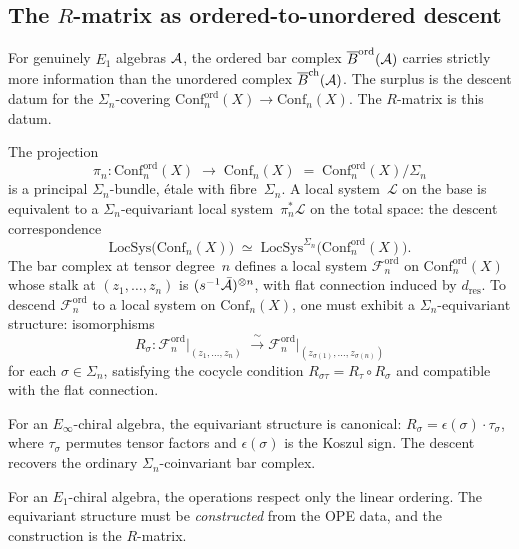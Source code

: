 \subsection{The $R$-matrix as ordered-to-unordered descent}
\label{subsec:r-matrix-monodromy}

For genuinely $E_1$ algebras $\mathcal{A}$, the ordered bar complex
$\overline{B}^{\mathrm{ord}}(\mathcal{A})$ carries strictly more information than the
unordered complex $\overline{B}^{\mathrm{ch}}(\mathcal{A})$. The surplus is the descent datum
for the $\Sigma_n$-covering
$\mathrm{Conf}_n^{\mathrm{ord}}(X)\to\mathrm{Conf}_n(X)$. The
$R$-matrix is this datum.

\begin{construction}
\label{constr:r-matrix-covering}
The projection
\[
\pi_n\colon
\mathrm{Conf}_n^{\mathrm{ord}}(X)
\;\longrightarrow\;
\mathrm{Conf}_n(X)
\;=\;
\mathrm{Conf}_n^{\mathrm{ord}}(X)/\Sigma_n
\]
is a principal $\Sigma_n$-bundle, \'etale with fibre~$\Sigma_n$.
A local system~$\mathcal{L}$ on the base is equivalent to a
$\Sigma_n$-equivariant local system~$\pi_n^*\mathcal{L}$ on the total
space: the descent correspondence
\[
\mathrm{LocSys}\bigl(\mathrm{Conf}_n(X)\bigr)
\;\simeq\;
\mathrm{LocSys}^{\Sigma_n}
\bigl(\mathrm{Conf}_n^{\mathrm{ord}}(X)\bigr).
\]
The bar complex at tensor degree~$n$ defines a local system
$\mathcal{F}_n^{\mathrm{ord}}$ on $\mathrm{Conf}_n^{\mathrm{ord}}(X)$
whose stalk at $(z_1,\dots,z_n)$ is
$(s^{-1}\bar{\mathcal{A}})^{\otimes n}$, with flat connection induced by
$d_{\mathrm{res}}$. To descend $\mathcal{F}_n^{\mathrm{ord}}$ to a
local system on $\mathrm{Conf}_n(X)$, one must exhibit a
$\Sigma_n$-equivariant structure: isomorphisms
\[
R_\sigma\colon
\mathcal{F}_n^{\mathrm{ord}}\big|_{(z_1,\dots,z_n)}
\;\xrightarrow{\;\sim\;}
\mathcal{F}_n^{\mathrm{ord}}\big|_{(z_{\sigma(1)},\dots,z_{\sigma(n)})}
\]
for each $\sigma\in\Sigma_n$, satisfying the cocycle condition
$R_{\sigma\tau}=R_\tau\circ R_\sigma$ and compatible with the
flat connection.

For an $E_\infty$-chiral algebra, the equivariant structure
is canonical: $R_\sigma=\epsilon(\sigma)\cdot\tau_\sigma$, where
$\tau_\sigma$ permutes tensor factors and $\epsilon(\sigma)$ is
the Koszul sign. The descent recovers the ordinary
$\Sigma_n$-coinvariant bar complex.

For an $E_1$-chiral algebra, the operations respect only
the linear ordering. The equivariant structure must be
\emph{constructed} from the OPE data, and the construction
is the $R$-matrix.
\end{construction}

